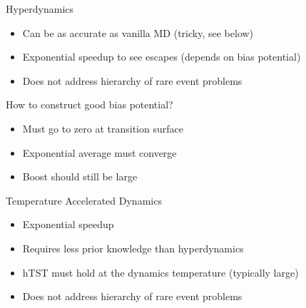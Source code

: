 \documentclass[onlymath]{beamer}
\begin{document}
\begin{frame}{Hyperdynamics}

  \begin{tcolorbox}[title=Pros,colback=white,colframe=green!50!black,]
    \begin{itemize}
      \item Can be as accurate as vanilla MD (tricky, see below) 
      \item Exponential speedup to see escapes (depends on bias potential)
    \end{itemize}
  \end{tcolorbox}

  \vspace{2mm}

  \begin{tcolorbox}[title=Cons,colback=white,colframe=red!50!black,]
    \begin{itemize}
      \item Does not address hierarchy of rare event problems
    \end{itemize}
    How to construct good bias potential?
    \begin{itemize}
      \item Must go to zero at transition surface
      \item Exponential average must converge
      \item Boost should still be large
    \end{itemize}
  \end{tcolorbox}

\end{frame}

\begin{frame}{Temperature Accelerated Dynamics}
  \begin{tcolorbox}[title=Pros,colback=white,colframe=green!50!black,]
    \begin{itemize}
      \item Exponential speedup
      \item Requires less prior knowledge than hyperdynamics
    \end{itemize}
  \end{tcolorbox}

  \vspace{2mm}

  \begin{tcolorbox}[title=Cons,colback=white,colframe=red!50!black,]
    \begin{itemize}
      \item hTST must hold at the dynamics temperature (typically large)
      \item Does not address hierarchy of rare event problems
    \end{itemize}
  \end{tcolorbox}
\end{frame}
\end{document}
